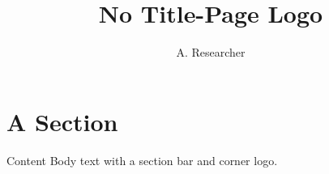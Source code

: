 \documentclass{beamer}
\title{No Title-Page Logo}
\author{A. Researcher}
\begin{document}
{
\begin{frame}[plain]\titlepage\end{frame}
}
\section{A Section}
\begin{frame}{Content}
Body text with a section bar and corner logo.
\end{frame}
\end{document}
